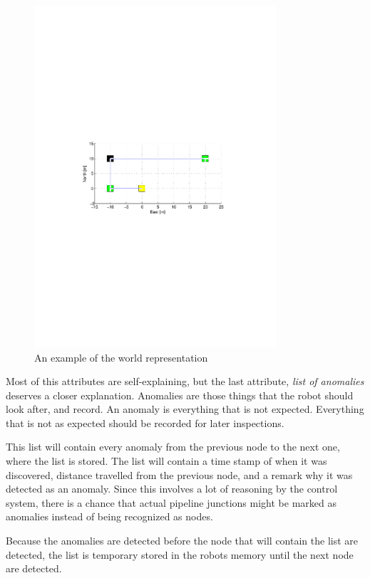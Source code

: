 \begin{figure}[htbp]
    \centering
    \includegraphics[width=0.8\textwidth]{pics/worldrepresentation}
    \caption{An example of the world representation}
    \label{chap5:fig-worldrepresentation}
\end{figure}
Most of this attributes are self-explaining, but the last attribute, \emph{list of
anomalies} deserves a closer explanation. 
Anomalies are those things that the robot should look after, and record. An anomaly is 
everything that is not expected. Everything that is not as expected should be recorded 
for later inspections. 

This list will contain every anomaly from the previous node to the next one, where the
list is stored. The list will contain a time stamp of when it was discovered, distance
travelled from the previous node, and a remark why it was detected as an anomaly. Since
this involves a lot of reasoning by the control system, there is a chance that actual
pipeline junctions might be marked as anomalies instead of being recognized as nodes.

Because the anomalies are detected before the node that will contain the list are
detected, the list is temporary stored in the robots memory until the next node are
detected. 

